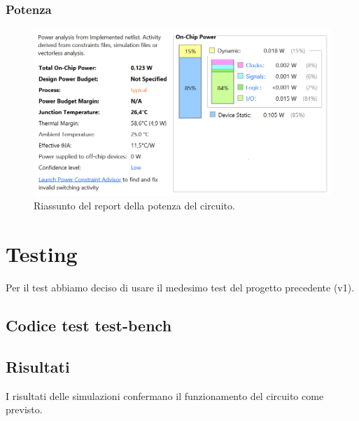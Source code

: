 \documentclass[12pt]{article}
\begin{document}
            \subsubsection{Potenza}
                \begin{figure}[ht]
                    \centering
                    \includegraphics[scale=0.8]{Power.png}
                    \caption{Riassunto del report della potenza del circuito.}
                \end{figure}

\section{Testing}
    Per il test abbiamo deciso di usare il medesimo test del progetto precedente (v1).

    \subsection{Codice test test-bench}
        

    \subsection{Risultati}
        I risultati delle simulazioni confermano il funzionamento del circuito come previsto.
\end{document}
